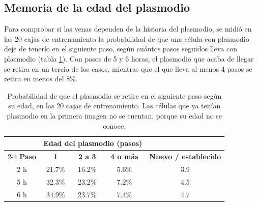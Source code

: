 %

\subsection{Memoria de la edad del plasmodio}

Para comprobar si las venas dependen de la historia del plasmodio, se midió en las 20 cajas de entrenamiento la probabilidad de que una célula con plasmodio deje de tenerlo en el siguiente paso, según cuántos pasos seguidos lleva con plasmodio (tabla \ref{tab:physarum_edad}). Con pasos de 5 y 6 horas, el plasmodio que acaba de llegar se retira en un tercio de los casos, mientras que el que lleva al menos 4 pasos se retira en menos del 8\%.

\begin{table}[htbp]
	\centering
	\footnotesize
	\begin{tabular}{@{}ccccc@{}}
		\toprule
		& \multicolumn{3}{c}{\textbf{Edad del plasmodio (pasos)}} & \\
		\cmidrule(lr){2-4}
		\textbf{Paso} & \textbf{1} & \textbf{2 a 3} & \textbf{4 o más} & \textbf{Nuevo / establecido} \\ \midrule
		2 h & 21.7\% & 16.2\% & 5.6\% & 3.9 \\
		5 h & 32.3\% & 23.2\% & 7.2\% & 4.5 \\
		6 h & 34.9\% & 23.7\% & 7.4\% & 4.7 \\
		\bottomrule
	\end{tabular}
	\caption{Probabilidad de que el plasmodio se retire en el siguiente paso según su edad, en las 20 cajas de entrenamiento. Las células que ya tenían plasmodio en la primera imagen no se cuentan, porque su edad no se conoce.}
	\label{tab:physarum_edad}
\end{table}

